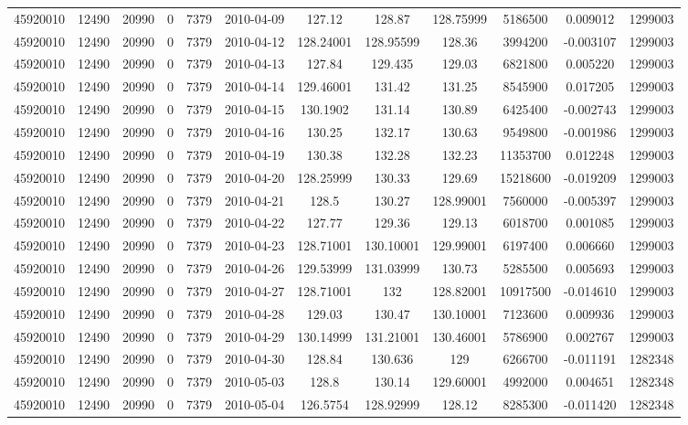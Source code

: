 \documentclass[12 pt]{article}
\begin{document}
\begin{flushleft}
\begin{table}[h]
\begin{tabular}{c c c c c c c c c c c c }
45920010 & 12490 & 20990 & 0 & 7379 & 2010-04-09 & 127.12 & 128.87 & 128.75999 & 5186500 & 0.009012 & 1299003\\
45920010 & 12490 & 20990 & 0 & 7379 & 2010-04-12 & 128.24001 & 128.95599 & 128.36 & 3994200 & -0.003107 & 1299003\\
45920010 & 12490 & 20990 & 0 & 7379 & 2010-04-13 & 127.84 & 129.435 & 129.03 & 6821800 & 0.005220 & 1299003\\
45920010 & 12490 & 20990 & 0 & 7379 & 2010-04-14 & 129.46001 & 131.42 & 131.25 & 8545900 & 0.017205 & 1299003\\
45920010 & 12490 & 20990 & 0 & 7379 & 2010-04-15 & 130.1902 & 131.14 & 130.89 & 6425400 & -0.002743 & 1299003\\
45920010 & 12490 & 20990 & 0 & 7379 & 2010-04-16 & 130.25 & 132.17 & 130.63 & 9549800 & -0.001986 & 1299003\\
45920010 & 12490 & 20990 & 0 & 7379 & 2010-04-19 & 130.38 & 132.28 & 132.23 & 11353700 & 0.012248 & 1299003\\
45920010 & 12490 & 20990 & 0 & 7379 & 2010-04-20 & 128.25999 & 130.33 & 129.69 & 15218600 & -0.019209 & 1299003\\
45920010 & 12490 & 20990 & 0 & 7379 & 2010-04-21 & 128.5 & 130.27 & 128.99001 & 7560000 & -0.005397 & 1299003\\
45920010 & 12490 & 20990 & 0 & 7379 & 2010-04-22 & 127.77 & 129.36 & 129.13 & 6018700 & 0.001085 & 1299003\\
45920010 & 12490 & 20990 & 0 & 7379 & 2010-04-23 & 128.71001 & 130.10001 & 129.99001 & 6197400 & 0.006660 & 1299003\\
45920010 & 12490 & 20990 & 0 & 7379 & 2010-04-26 & 129.53999 & 131.03999 & 130.73 & 5285500 & 0.005693 & 1299003\\
45920010 & 12490 & 20990 & 0 & 7379 & 2010-04-27 & 128.71001 & 132 & 128.82001 & 10917500 & -0.014610 & 1299003\\
45920010 & 12490 & 20990 & 0 & 7379 & 2010-04-28 & 129.03 & 130.47 & 130.10001 & 7123600 & 0.009936 & 1299003\\
45920010 & 12490 & 20990 & 0 & 7379 & 2010-04-29 & 130.14999 & 131.21001 & 130.46001 & 5786900 & 0.002767 & 1299003\\
45920010 & 12490 & 20990 & 0 & 7379 & 2010-04-30 & 128.84 & 130.636 & 129 & 6266700 & -0.011191 & 1282348\\
45920010 & 12490 & 20990 & 0 & 7379 & 2010-05-03 & 128.8 & 130.14 & 129.60001 & 4992000 & 0.004651 & 1282348\\
45920010 & 12490 & 20990 & 0 & 7379 & 2010-05-04 & 126.5754 & 128.92999 & 128.12 & 8285300 & -0.011420 & 1282348\\

\end{tabular}
\end{table}
\end{flushleft}
\end{document}
